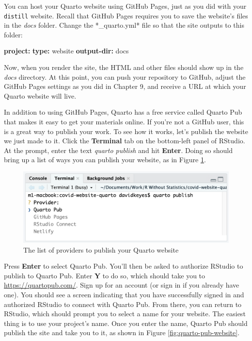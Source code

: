 \documentclass[
]{book}
\newenvironment{Shaded}{\begin{snugshade}}{\end{snugshade}}
\newcommand{\AttributeTok}[1]{\textcolor[rgb]{0.13,0.29,0.53}{#1}}
\newcommand{\FunctionTok}[1]{\textcolor[rgb]{0.13,0.29,0.53}{\textbf{#1}}}
\newcommand{\KeywordTok}[1]{\textcolor[rgb]{0.13,0.29,0.53}{\textbf{#1}}}
\begin{document}
You can host your Quarto website using GitHub Pages, just as you did with your \texttt{distill} website. Recall that GitHub Pages requires you to save the website's files in the \emph{docs} folder. Change the *\_quarto.yml* file so that the site outputs to this folder:

\begin{Shaded}
\begin{Highlighting}[]
\FunctionTok{project}\KeywordTok{:}
\AttributeTok{  }\FunctionTok{type}\KeywordTok{:}\AttributeTok{ website}
\AttributeTok{  }\FunctionTok{output{-}dir}\KeywordTok{:}\AttributeTok{ docs}
\end{Highlighting}
\end{Shaded}

Now, when you render the site, the HTML and other files should show up in the \emph{docs} directory. At this point, you can push your repository to GitHub, adjust the GitHub Pages settings as you did in Chapter 9, and receive a URL at which your Quarto website will live.

In addition to using GitHub Pages, Quarto has a free service called Quarto Pub that makes it easy to get your materials online. If you're not a GitHub user, this is a great way to publish your work. To see how it works, let's publish the website we just made to it. Click the \textbf{Terminal} tab on the bottom-left panel of RStudio. At the prompt, enter the text \emph{quarto publish} and hit \textbf{Enter}. Doing so should bring up a list of ways you can publish your website, as in Figure \ref{fig:quarto-publish}.

\begin{figure}
\includegraphics[width=1\linewidth]{assets/quarto-publish} \caption{The list of providers to publish your Quarto website}\label{fig:quarto-publish}
\end{figure}

Press \textbf{Enter} to select Quarto Pub. You'll then be asked to authorize RStudio to publish to Quarto Pub. Enter \textbf{Y} to do so, which should take you to \url{https://quartopub.com/}. Sign up for an account (or sign in if you already have one). You should see a screen indicating that you have successfully signed in and authorized RStudio to connect with Quarto Pub. From there, you can return to RStudio, which should prompt you to select a name for your website. The easiest thing is to use your project's name. Once you enter the name, Quarto Pub should publish the site and take you to it, as shown in Figure \ref{fig:quarto-pub-website}.
\end{document}

